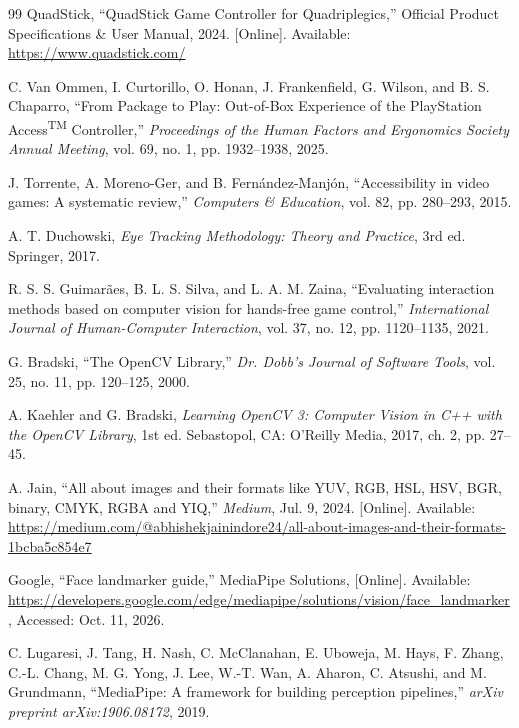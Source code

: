 \documentclass[twoside, a4paper, 11pt]{article}
\begin{document}
\begin{thebibliography}{99}
QuadStick, ``QuadStick Game Controller for Quadriplegics,'' Official Product Specifications \& User Manual, 2024. [Online]. Available: \url{https://www.quadstick.com/}

C. Van Ommen, I. Curtorillo, O. Honan, J. Frankenfield, G. Wilson, and B. S. Chaparro, ``From Package to Play: Out-of-Box Experience of the PlayStation Access\textsuperscript{TM} Controller,'' \emph{Proceedings of the Human Factors and Ergonomics Society Annual Meeting}, vol. 69, no. 1, pp. 1932--1938, 2025.

J. Torrente, A. Moreno-Ger, and B. Fern\'{a}ndez-Manj\'{o}n, ``Accessibility in video games: A systematic review,'' \emph{Computers \& Education}, vol. 82, pp. 280--293, 2015.

A. T. Duchowski, \emph{Eye Tracking Methodology: Theory and Practice}, 3rd ed. Springer, 2017.

R. S. S. Guimar\~{a}es, B. L. S. Silva, and L. A. M. Zaina, ``Evaluating interaction methods based on computer vision for hands-free game control,'' \emph{International Journal of Human-Computer Interaction}, vol. 37, no. 12, pp. 1120--1135, 2021.

G. Bradski, ``The OpenCV Library,'' \emph{Dr. Dobb's Journal of Software Tools}, vol. 25, no. 11, pp. 120--125, 2000.

A. Kaehler and G. Bradski, \emph{Learning OpenCV 3: Computer Vision in C++ with the OpenCV Library}, 1st ed. Sebastopol, CA: O'Reilly Media, 2017, ch. 2, pp. 27--45.

A. Jain, ``All about images and their formats like YUV, RGB, HSL, HSV, BGR, binary, CMYK, RGBA and YIQ,'' \emph{Medium}, Jul. 9, 2024. [Online]. Available: \url{https://medium.com/@abhishekjainindore24/all-about-images-and-their-formats-1bcba5c854e7}

Google, ``Face landmarker guide,'' MediaPipe Solutions, [Online]. Available: \url{https://developers.google.com/edge/mediapipe/solutions/vision/face_landmarker}, Accessed: Oct. 11, 2026.

C. Lugaresi, J. Tang, H. Nash, C. McClanahan, E. Uboweja, M. Hays, F. Zhang, C.-L. Chang, M. G. Yong, J. Lee, W.-T. Wan, A. Aharon, C. Atsushi, and M. Grundmann, ``MediaPipe: A framework for building perception pipelines,'' \emph{arXiv preprint arXiv:1906.08172}, 2019.


\end{thebibliography}
\end{document}
